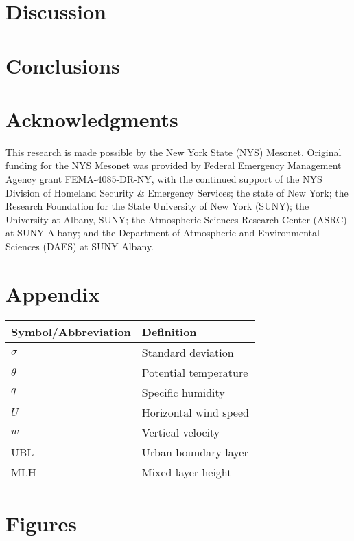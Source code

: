 \documentclass[11pt,a4paper]{article}
\begin{document}
\section{Discussion}

\section{Conclusions}

\section*{Acknowledgments}
This research is made possible by the New York State (NYS) Mesonet. Original funding for the NYS Mesonet was provided by Federal Emergency Management Agency grant FEMA-4085-DR-NY, with the continued support of the NYS Division of Homeland Security \& Emergency Services; the state of New York; the Research Foundation for the State University of New York (SUNY); the University at Albany, SUNY; the Atmospheric Sciences Research Center (ASRC) at SUNY Albany; and the Department of Atmospheric and Environmental Sciences (DAES) at SUNY Albany.

\printbibliography

\section*{Appendix}

\label{tab:symbols}
\begin{center}
	\begin{tabularx}{0.5\textwidth}{l X}
 		\hline
 		Symbol/Abbreviation & Definition \\
 		\hline
 		$\sigma$ & Standard deviation \\
 		$\theta$ & Potential temperature \\
 		$q$ & Specific humidity \\
 		$U$ & Horizontal wind speed \\
 		$w$ & Vertical velocity \\
 		UBL & Urban boundary layer \\
 		MLH & Mixed layer height \\
 		\hline
	\end{tabularx}
\end{center}

\section*{Figures}
\end{document}
